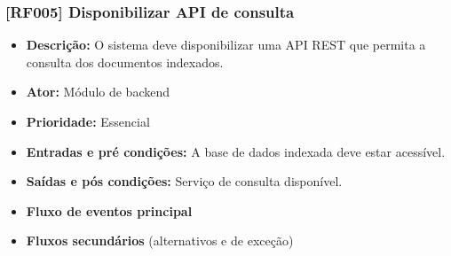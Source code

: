 \subsubsection{[RF005] Disponibilizar API de consulta}
\begin{itemize}
   \item \textbf{Descrição:} O sistema deve disponibilizar uma API REST que permita a consulta dos documentos indexados.
   \item \textbf{Ator:} Módulo de backend
   \item \textbf{Prioridade:} Essencial
   \item \textbf{Entradas e pré condições:} A base de dados indexada deve estar acessível.
   \item \textbf{Saídas e pós condições:} Serviço de consulta disponível.
   \item \textbf{Fluxo de eventos principal}
   \item \textbf{Fluxos secundários} (alternativos e de exceção)
 \end{itemize}

